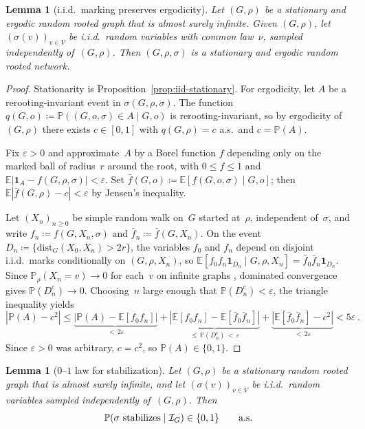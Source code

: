 \documentclass[aop]{imsart}
\theoremstyle{plain}
\newtheorem{lemma}[theorem]{Lemma}
\theoremstyle{definition}
\newcommand{\E}{\mathbb{E}}
\renewcommand{\P}{\mathbb{P}}
\newcommand{\eps}{\varepsilon}
\newcommand{\one}{\mathbf{1}}
\begin{document}
	\begin{lemma}[i.i.d.\ marking preserves ergodicity]\label{lem:ergodic-marked-stationary}
		Let $(G,\rho)$ be a stationary and ergodic random rooted graph that is almost surely infinite. Given $(G,\rho)$, let $(\sigma(v))_{v\in V}$ be i.i.d.\ random variables with common law~$\nu$, sampled independently of~$(G,\rho)$. Then $(G,\rho,\sigma)$ is a stationary and ergodic random rooted network.
	\end{lemma}
	
	\begin{proof}
		Stationarity is Proposition~\ref{prop:iid-stationary}. For ergodicity, let $A$ be a rerooting-invariant event in $\sigma(G,\rho,\sigma)$. The function $q(G,o)\coloneqq\P((G,o,\sigma)\in A\mid G,o)$ is rerooting-invariant, so by ergodicity of~$(G,\rho)$ there exists $c\in[0,1]$ with $q(G,\rho)=c$ a.s.\ and $c=\P(A)$.
		
		Fix $\eps>0$ and approximate~$A$ by a Borel function $f$ depending only on the marked ball of radius~$r$ around the root, with $0\leq f\leq 1$ and $\E|\one_A-f(G,\rho,\sigma)|<\eps$. Set $\bar{f}(G,o)\coloneqq\E[f(G,o,\sigma)\mid G,o]$; then $\E|\bar{f}(G,\rho)-c|<\eps$ by Jensen's inequality.
		
		Let $(X_n)_{n\geq 0}$ be simple random walk on~$G$ started at~$\rho$, independent of~$\sigma$, and write $f_n\coloneqq f(G,X_n,\sigma)$ and $\bar{f}_n\coloneqq\bar{f}(G,X_n)$. On the event $D_n\coloneqq\{\mathrm{dist}_G(X_0,X_n)>2r\}$, the variables $f_0$ and $f_n$ depend on disjoint i.i.d.\ marks conditionally on $(G,\rho,X_n)$, so $\E[f_0 f_n\one_{D_n}\mid G,\rho,X_n]=\bar{f}_0\bar{f}_n\one_{D_n}$. Since $\P_\rho(X_n=v)\to 0$ for each~$v$ on infinite graphs \citep[Exercise~2.1(f)]{LP16}, dominated convergence gives $\P(D_n^c)\to 0$. Choosing~$n$ large enough that $\P(D_n^c)<\eps$, the triangle inequality yields
		\[
		|\P(A)-c^2|
		\leq\underbrace{|\P(A)-\E[f_0 f_n]|}_{<\,2\eps}
		+\underbrace{|\E[f_0 f_n]-\E[\bar{f}_0\bar{f}_n]|}_{\leq\,\P(D_n^c)\,<\,\eps}
		+\underbrace{|\E[\bar{f}_0\bar{f}_n]-c^2|}_{<\,2\eps}<5\eps\,.
		\]
		Since $\eps>0$ was arbitrary, $c=c^2$, so $\P(A)\in\{0,1\}$.
	\end{proof}
	
	\begin{lemma}[$0$--$1$ law for stabilization]\label{lem:01-stationary}
		Let $(G,\rho)$ be a stationary random rooted graph that is almost surely infinite, and let $(\sigma(v))_{v\in V}$ be i.i.d.\ random variables sampled independently of~$(G,\rho)$. Then
		\[
		\P(\sigma\textup{ stabilizes}\mid\mathcal{I}_G)\in\{0,1\}\qquad\text{a.s.}
		\]
	\end{lemma}
	
\end{document}

